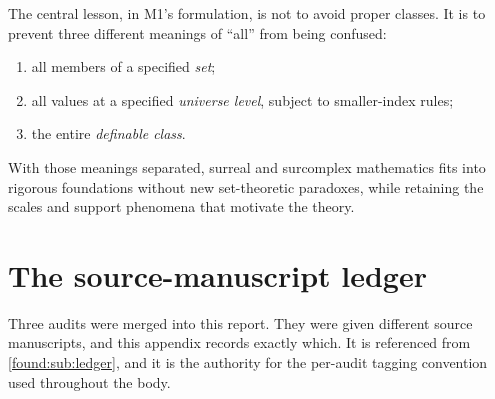 \documentclass[11pt,letterpaper]{article}
\numberwithin{equation}{section}
\theoremstyle{definition}
\theoremstyle{remark}
\begin{document}
The central lesson, in M1's formulation, is not to avoid proper classes. It is
to prevent three different meanings of ``all'' from being confused:
\begin{enumerate}
\item all members of a specified \emph{set};
\item all values at a specified \emph{universe level}, subject to
smaller-index rules;
\item the entire \emph{definable class}.
\end{enumerate}
With those meanings separated, surreal and surcomplex mathematics fits into
rigorous foundations without new set-theoretic paradoxes, while retaining the
scales and support phenomena that motivate the theory.
\appendix

\section{The source-manuscript ledger}
\label{found:app:ledger}

Three audits were merged into this report. They were given different source
manuscripts, and this appendix records exactly which. It is referenced from
\cref{found:sub:ledger}, and it is the authority for the per-audit tagging
convention used throughout the body.
\end{document}

